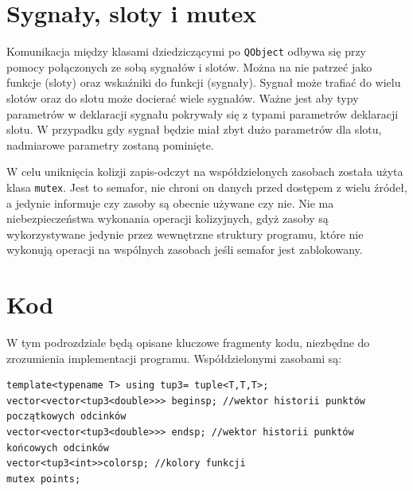 \section{Sygnały, sloty i mutex}
\label{sec::sig_slot}
Komunikacja między klasami dziedziczącymi po \texttt{QObject} odbywa się przy pomocy połączonych ze sobą sygnałów i slotów. Można na nie patrzeć jako funkcje (sloty) oraz wskaźniki do funkcji (sygnały). Sygnał może trafiać do wielu slotów oraz do slotu może docierać wiele sygnałów. Ważne jest aby typy parametrów w deklaracji sygnału pokrywały się z typami parametrów deklaracji slotu. W przypadku gdy sygnał będzie miał zbyt dużo parametrów dla slotu, nadmiarowe parametry zostaną pominięte.

W celu uniknięcia kolizji zapis-odczyt na współdzielonych zasobach została użyta klasa \texttt{mutex}. Jest to semafor, nie chroni on danych przed dostępem z wielu źródeł, a jedynie informuje czy zasoby są obecnie używane czy nie. Nie ma niebezpieczeństwa wykonania operacji kolizyjnych, gdyż zasoby są wykorzystywane jedynie przez wewnętrzne struktury programu, które nie wykonują operacji na wspólnych zasobach jeśli semafor jest zablokowany.

\section{Kod}
\label{sec::kod}
W tym podrozdziale będą opisane kluczowe fragmenty kodu, niezbędne do zrozumienia implementacji programu. Współdzielonymi zasobami są:
\begin{lstlisting}
template<typename T> using tup3= tuple<T,T,T>;
vector<vector<tup3<double>>> beginsp; //wektor historii punktów początkowych odcinków
vector<vector<tup3<double>>> endsp; //wektor historii punktów końcowych odcinków
vector<tup3<int>>colorsp; //kolory funkcji
mutex points;
\end{lstlisting}


